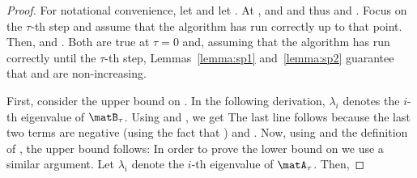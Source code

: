 \begin{proof}
For notational convenience, let \math{\phiu_\tau=\phiu(\scu_\tau,\matB_\tau)} and let \math{\phil_\tau=\phil(\scl_\tau,\matA_\tau)}. At ,  and  and thus  and . Focus on the $\tau$-th step and assume that the algorithm has run correctly up to that point. Then,
 and . Both are true at $\tau=0$ and, assuming that the algorithm has run correctly until the $\tau$-th step, Lemmas~\ref{lemma:sp1} and~\ref{lemma:sp2} guarantee that \math{\phiu_\tau} and \math{\phil_\tau} are non-increasing.

First, consider the upper bound on . In the following derivation, $\lambda_i$ denotes the $i$-th eigenvalue of $\matB_{\tau}$. Using
\math{\trace(\u\transp\matX\u)=\trace(\matX\u\u\transp)} and
, we get
The last line follows because the last two
terms are negative (using the fact that ) and . Now,
using  and the definition of
\math{\delta_\scu}, the upper bound follows:
In order to prove the lower bound on  we use a similar argument. Let $\lambda_i$ denote the $i$-th eigenvalue of $\matA_{\tau}$. Then,
\end{proof}
